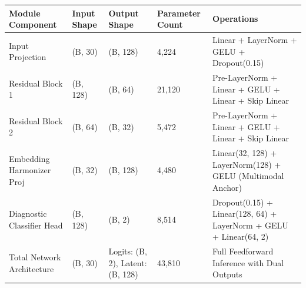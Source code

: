 \begin{tabular}{lllll}
\toprule
Module Component & Input Shape & Output Shape & Parameter Count & Operations \\
\midrule
Input Projection & (B, 30) & (B, 128) & 4,224 & Linear + LayerNorm + GELU + Dropout(0.15) \\
Residual Block 1 & (B, 128) & (B, 64) & 21,120 & Pre-LayerNorm + Linear + GELU + Linear + Skip Linear \\
Residual Block 2 & (B, 64) & (B, 32) & 5,472 & Pre-LayerNorm + Linear + GELU + Linear + Skip Linear \\
Embedding Harmonizer Proj & (B, 32) & (B, 128) & 4,480 & Linear(32, 128) + LayerNorm(128) + GELU (Multimodal Anchor) \\
Diagnostic Classifier Head & (B, 128) & (B, 2) & 8,514 & Dropout(0.15) + Linear(128, 64) + LayerNorm + GELU + Linear(64, 2) \\
Total Network Architecture & (B, 30) & Logits: (B, 2), Latent: (B, 128) & 43,810 & Full Feedforward Inference with Dual Outputs \\
\bottomrule
\end{tabular}
